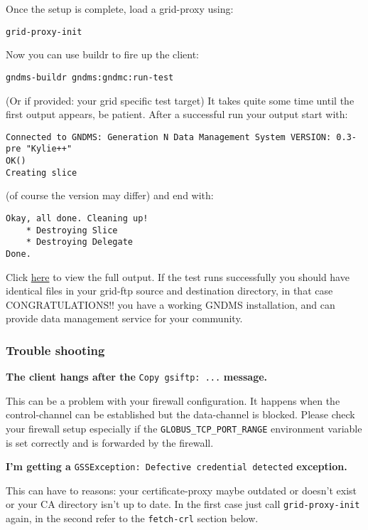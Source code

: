 \documentclass{article}
\begin{document}
Once the setup is complete, load a grid-proxy using:

\begin{verbatim}
grid-proxy-init
\end{verbatim}
Now you can use buildr to fire up the client:

\begin{verbatim}
gndms-buildr gndms:gndmc:run-test
\end{verbatim}
(Or if provided: your grid specific test target) It takes quite
some time until the first output appears, be patient. After a
successful run your output start with:

\begin{verbatim}
Connected to GNDMS: Generation N Data Management System VERSION: 0.3-pre "Kylie++"
OK()
Creating slice
\end{verbatim}
(of course the version may differ) and end with:

\begin{verbatim}
Okay, all done. Cleaning up!
    * Destroying Slice
    * Destroying Delegate
Done.
\end{verbatim}
Click \href{test-output.txt}{here} to view the full output. If the
test runs successfully you should have identical files in your
grid-ftp source and destination directory, in that case
CONGRATULATIONS!! you have a working GNDMS installation, and can
provide data management service for your community.

\subsubsection{Trouble shooting}

\textbf{The client hangs after the }\verb|Copy gsiftp: ...|\textbf{
message.}

This can be a problem with your firewall configuration. It
happens when the control-channel can be established but the
data-channel is blocked. Please check your firewall setup
especially if the \verb!GLOBUS_TCP_PORT_RANGE! environment variable
is set correctly and is forwarded by the firewall.

\textbf{I'm getting a }\verb|GSSException: Defective credential detected|\textbf{ exception.}

This can have to reasons: your certificate-proxy maybe outdated
or doesn't exist or your CA directory isn't up to date. In the
first case just call \verb!grid-proxy-init! again, in the second
refer to the \verb!fetch-crl! section below.
\end{document}
